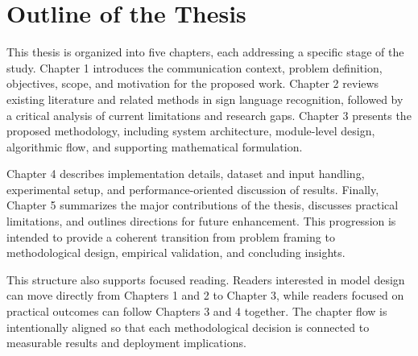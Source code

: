\section{Outline of the Thesis}
This thesis is organized into five chapters, each addressing a specific stage of the study. Chapter 1 introduces the communication context, problem definition, objectives, scope, and motivation for the proposed work. Chapter 2 reviews existing literature and related methods in sign language recognition, followed by a critical analysis of current limitations and research gaps. Chapter 3 presents the proposed methodology, including system architecture, module-level design, algorithmic flow, and supporting mathematical formulation.

Chapter 4 describes implementation details, dataset and input handling, experimental setup, and performance-oriented discussion of results. Finally, Chapter 5 summarizes the major contributions of the thesis, discusses practical limitations, and outlines directions for future enhancement. This progression is intended to provide a coherent transition from problem framing to methodological design, empirical validation, and concluding insights.

This structure also supports focused reading. Readers interested in model design can move directly from Chapters 1 and 2 to Chapter 3, while readers focused on practical outcomes can follow Chapters 3 and 4 together. The chapter flow is intentionally aligned so that each methodological decision is connected to measurable results and deployment implications.

